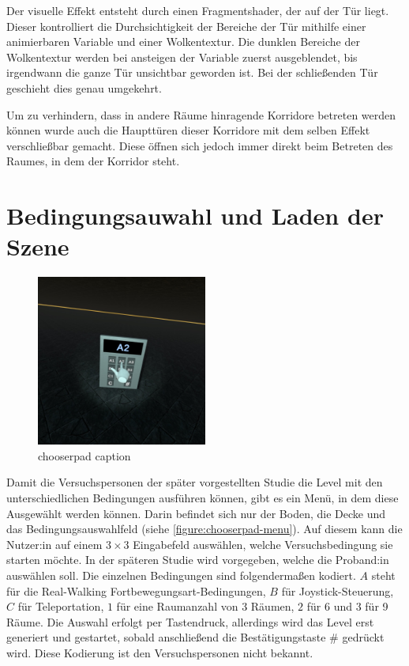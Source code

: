 Der visuelle Effekt entsteht durch einen Fragmentshader, der auf der Tür liegt. Dieser kontrolliert die Durchsichtigkeit der Bereiche der Tür mithilfe einer animierbaren Variable und einer Wolkentextur. Die dunklen Bereiche der Wolkentextur werden bei ansteigen der Variable zuerst ausgeblendet, bis irgendwann die ganze Tür unsichtbar geworden ist. Bei der schließenden Tür geschieht dies genau umgekehrt.

Um zu verhindern, dass in andere Räume hinragende Korridore betreten werden können wurde auch die Haupttüren dieser Korridore mit dem selben Effekt verschließbar gemacht. Diese öffnen sich jedoch immer direkt beim Betreten des Raumes, in dem der Korridor steht.

\section{Bedingungsauwahl und Laden der Szene} \label{sec:chooserpad}
\begin{figure}[!h]
    \centering
    \includegraphics[width=0.5\textwidth]{vrscreenshots/better_chooserpad.jpg}
    \caption{chooserpad caption}\label{figure:chooserpad-menu}
\end{figure}
Damit die Versuchspersonen der später vorgestellten Studie die Level mit den unterschiedlichen Bedingungen ausführen können, gibt es ein Menü, in dem diese Ausgewählt werden können. Darin befindet sich nur der Boden, die Decke und das Bedingungsauswahlfeld (siehe \autoref{figure:chooserpad-menu}). Auf diesem kann die Nutzer:in auf einem $3 \times 3$ Eingabefeld auswählen, welche Versuchsbedingung sie starten möchte. In der späteren Studie wird vorgegeben, welche die Proband:in auswählen soll. Die einzelnen Bedingungen sind folgendermaßen kodiert. $A$ steht für die Real-Walking Fortbewegungsart-Bedingungen, $B$ für Joystick-Steuerung, $C$ für Teleportation, $1$ für eine Raumanzahl von 3 Räumen, $2$ für 6 und $3$ für 9 Räume. Die Auswahl erfolgt per Tastendruck, allerdings wird das Level erst generiert und gestartet, sobald anschließend die Bestätigungstaste \# gedrückt wird. Diese Kodierung ist den Versuchspersonen nicht bekannt.

